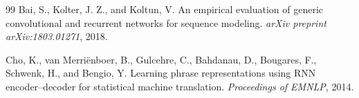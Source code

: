\documentclass[11pt]{article}
\begin{document}
\begin{thebibliography}{99}
Bai, S., Kolter, J. Z., and Koltun, V.
\newblock An empirical evaluation of generic convolutional and recurrent
networks for sequence modeling.
\newblock \emph{arXiv preprint arXiv:1803.01271}, 2018.

Cho, K., van Merri\"enboer, B., Gulcehre, C., Bahdanau, D.,
Bougares, F., Schwenk, H., and Bengio, Y.
\newblock Learning phrase representations using RNN encoder--decoder for
statistical machine translation.
\newblock \emph{Proceedings of EMNLP}, 2014.

\end{thebibliography}
\end{document}
